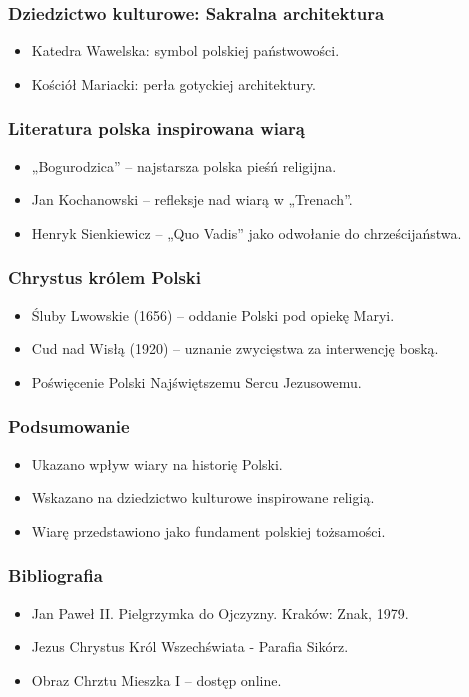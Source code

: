 \documentclass{beamer}
\begin{document}
\begin{frame}
    \frametitle{Dziedzictwo kulturowe: Sakralna architektura}
    \begin{itemize}
        \item Katedra Wawelska: symbol polskiej państwowości.
        \item Kościół Mariacki: perła gotyckiej architektury.
    \end{itemize}
\end{frame}

\begin{frame}
    \frametitle{Literatura polska inspirowana wiarą}
    \begin{itemize}
        \item „Bogurodzica” – najstarsza polska pieśń religijna.
        \item Jan Kochanowski – refleksje nad wiarą w „Trenach”.
        \item Henryk Sienkiewicz – „Quo Vadis” jako odwołanie do chrześcijaństwa.
    \end{itemize}
\end{frame}

\begin{frame}
    \frametitle{Chrystus królem Polski}
    \begin{itemize}
        \item Śluby Lwowskie (1656) – oddanie Polski pod opiekę Maryi.
        \item Cud nad Wisłą (1920) – uznanie zwycięstwa za interwencję boską.
        \item Poświęcenie Polski Najświętszemu Sercu Jezusowemu.
    \end{itemize}
\end{frame}

\begin{frame}
    \frametitle{Podsumowanie}
    \begin{itemize}
        \item Ukazano wpływ wiary na historię Polski.
        \item Wskazano na dziedzictwo kulturowe inspirowane religią.
        \item Wiarę przedstawiono jako fundament polskiej tożsamości.
    \end{itemize}
\end{frame}

\begin{frame}
    \frametitle{Bibliografia}
    \begin{itemize}
        \item Jan Paweł II. Pielgrzymka do Ojczyzny. Kraków: Znak, 1979.
        \item Jezus Chrystus Król Wszechświata - Parafia Sikórz.
        \item Obraz Chrztu Mieszka I – dostęp online.
    \end{itemize}
\end{frame}
\end{document}
